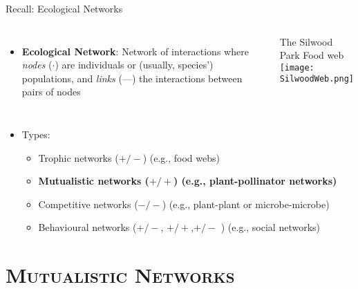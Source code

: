 \begin{frame}{Recall: Ecological Networks}

  \begin{columns}[c]
    \begin{itemize}[<+->]\setlength{\itemindent}{0em} \itemsep6pt
      \item {\bf Ecological Network}: Network of interactions where {\it nodes} ($\boldsymbol{\cdot}$) are individuals or (usually, species') populations, and {\it links} (---) the interactions between pairs of nodes 
    \end{itemize}
    \centering
    {\footnotesize The Silwood Park Food web}\\
    \vspace{3pt}
    \texttt{[image: SilwoodWeb.png]}
  \end{columns}
  \pause 
  \vspace{6pt}
  \begin{itemize} \setlength{\itemindent}{-1em}
    \item Types:
    \begin{itemize}\setlength{\itemindent}{-2em}\itemsep10pt
    \item Trophic networks ($+/-$) (e.g., food webs)
    \item {\bf Mutualistic networks ($+/+$) (e.g., plant-pollinator networks)}    
    \item Competitive networks ($-/-$) (e.g., plant-plant or microbe-microbe)
    \item Behavioural networks ($+/-$, $+/+$,$+/-$ ) (e.g., social networks)
   \end{itemize} 
  \end{itemize}
  
  \end{frame}

\section{\scshape Mutualistic Networks}

